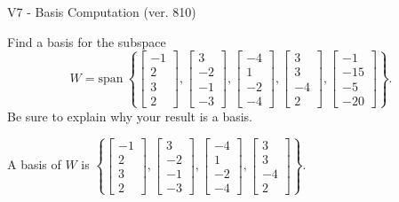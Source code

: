 \begin{exercise}
  \begin{exerciseTitle}V7 - Basis Computation (ver. 810)\end{exerciseTitle}
  \begin{exerciseStatement}
    Find a basis for the subspace 
\[W=\mathrm{span}\ \left\{\left[\begin{array}{r}
-1 \\
2 \\
3 \\
2
\end{array}\right] , \left[\begin{array}{r}
3 \\
-2 \\
-1 \\
-3
\end{array}\right] , \left[\begin{array}{r}
-4 \\
1 \\
-2 \\
-4
\end{array}\right] , \left[\begin{array}{r}
3 \\
3 \\
-4 \\
2
\end{array}\right] , \left[\begin{array}{r}
-1 \\
-15 \\
-5 \\
-20
\end{array}\right]\right\}.\]
 Be sure to explain why your result is a basis.


  \end{exerciseStatement}
  \begin{exerciseAnswer}
   A basis of \(W\) is  \(\left\{\left[\begin{array}{r}
-1 \\
2 \\
3 \\
2
\end{array}\right] , \left[\begin{array}{r}
3 \\
-2 \\
-1 \\
-3
\end{array}\right] , \left[\begin{array}{r}
-4 \\
1 \\
-2 \\
-4
\end{array}\right] , \left[\begin{array}{r}
3 \\
3 \\
-4 \\
2
\end{array}\right]\right\}\).
  


  \end{exerciseAnswer}
\end{exercise}